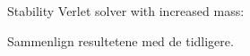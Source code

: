 \documentclass[../main.tex]{subfiles}
\begin{document}
%
%

Stability Verlet solver with increased mass:

Sammenlign resultetene med de tidligere.
\end{document}
